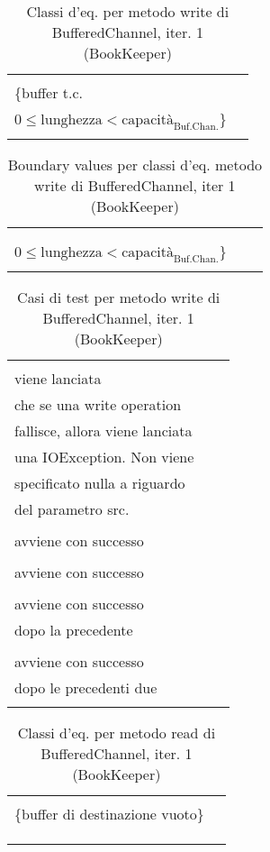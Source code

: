 \documentclass[10pt, a4paper]{article}
\newcommand{\Intmaketable}[4]{
	\begin{longtable}{#3}
	#4
	\caption{#2}
	\label{#1}
	\end{longtable}
}
\newcommand{\Intceqtable}[3]{
	\Intmaketable{#1}{#2}{|l|l|}{
	\hline
	\thead{Parametro formale} & \thead{Classi d'equivalenza} \\
	\hline
	\hline
	#3
	\hline}
}
\newcommand{\Intbvtable}[3]{
	\Intmaketable{#1}{#2}{|l|l|l|}{
	\hline
	\thead{Parametro formale} & \thead{Classe d'equivalenza} & \thead{Boundary value}\\
	\hline
	\hline
	#3
	\hline}
}
\newcommand{\Inttestctable}[3]{
	\Intmaketable{#1}{#2}{|l|l|l|}{
	\hline
	\thead{Input} & \thead{Esito atteso} & \thead{Motivazione}\\
	\hline
	\hline
	#3
	\hline}
}
\newcommand{\Intceqcaption}[4]{Classi d'eq. per metodo #1 di #2, iter. #3 (#4)}
\newcommand{\Intbvcaption}[4]{Boundary values per classi d'eq. metodo #1 di #2, iter #3 (#4)}
\newcommand{\Inttestccaption}[4]{Casi di test per metodo #1 di #2, iter. #3 (#4)}
\newcommand{\gettablelabel}[5]{table:#1:#2:#3:iter#4:proj#5}
\newcommand{\ceqtable}[5]{
	\Intceqtable{\gettablelabel{ceq}{#1}{#2}{#3}{#4}}
		{\Intceqcaption{#1}{#2}{#3}{#4}}
		{#5}
}
\newcommand{\bvtable}[5]{
	\Intbvtable{\gettablelabel{bv}{#1}{#2}{#3}{#4}}
		{\Intbvcaption{#1}{#2}{#3}{#4}}
		{#5}
}
\newcommand{\testctable}[5]{
	\Inttestctable{\gettablelabel{testc}{#1}{#2}{#3}{#4}}
		{\Inttestccaption{#1}{#2}{#3}{#4}}
		{#5}
}
\newcommand{\tcell}{\makecell[tl]}
\newcommand{\newtrow}{\\ \hline}
\def\bookkeeper{BookKeeper}
\newcommand{\ceq}[1]{\{#1\}}
\begin{document}
	
	\ceqtable{write}{BufferedChannel}{1}{\bookkeeper}{
			\tcell{src} & \tcell{
				\ceq{null}\\
				\ceq{buffer t.c.\\
				$0 \le \text{lunghezza} < \text{capacità}_\text{Buf.Chan.}$}}
		\newtrow
	}
				
	\bvtable{write}{BufferedChannel}{1}{\bookkeeper}{
			\tcell{src} & \tcell{\ceq{null}} & \tcell{null}
		\newtrow
			\tcell{src} & \tcell{\ceq{buffer t.c.\\
				$0 \le \text{lunghezza} < \text{capacità}_\text{Buf.Chan.}$}} & \tcell{ByteBuf("")}
		\newtrow
	}
	
	\testctable{write}{BufferedChannel}{1}{\bookkeeper}{
			\tcell{null} & 
			\tcell{NullPointerException\\ viene lanciata} & 
			\tcell{
				La documentazione specifica\\ 
				che se una write operation\\
				fallisce, allora viene lanciata\\
				una IOException. Non viene\\
				specificato nulla a riguardo\\
				del parametro src.}
		\newtrow
			\tcell{ByteBuf("")} & 
			\tcell{
				La scrittura nel buffer\\ 
				avviene con successo} & 
			\tcell{}
		\newtrow
			\tcell{ByteBuf("random data")} &
			\tcell{
				La scrittura nel buffer\\ 
				avviene con successo} &
			\tcell{}
		\newtrow
			\tcell{ByteBuf("more random data")} &
			\tcell{
				La scrittura nel buffer\\ 
				avviene con successo\\
				dopo la precedente} &
			\tcell{}
		\newtrow
			\tcell{ByteBuf("again random data")} &
			\tcell{
				La scrittura nel buffer\\ 
				avviene con successo\\
				dopo le precedenti due} &
			\tcell{}
		\newtrow
	}
	
	\newpage
	
	\ceqtable{read}{BufferedChannel}{1}{\bookkeeper}{
			\tcell{dest} & \tcell{\ceq{null}\\\ceq{buffer di destinazione vuoto}}
		\newtrow
			\tcell{pos} & \tcell{\ceq{$< 0$},\ceq{$\ge 0$}}
		\newtrow
			\tcell{length} & \tcell{\ceq{$< 0$}, \ceq{$0$}, \ceq{$\ge 1$}}
		\newtrow
	}
	
\end{document}
